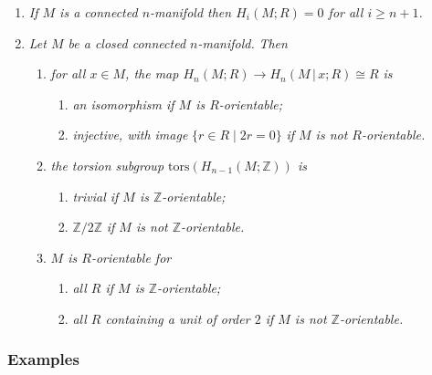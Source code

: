 \documentclass[10pt]{article}
\newcommand{\zz}{\mathbb{Z}}
\newcommand{\vbar}{\,|\,}
\begin{document}
            \begin{enumerate}
                \item \emph{If $M$ is a connected $n$-manifold then $H_i(M;R)=0$ for all $i\geqslant n+1$.}
                \item \emph{Let $M$ be a \emph{closed} connected $n$-manifold.}
                    \emph{Then}
                    \begin{enumerate}
                        \item \emph{for all $x\in M$, the map $H_n(M;R)\to H_n(M\vbar x;R)\cong R$ is}
                            \begin{enumerate}[label=(\roman*)]
                                \item \emph{an isomorphism if $M$ is $R$-orientable;}
                                \item \emph{injective, with image} $\{r\in R\mid 2r=0\}$ \emph{if $M$ is \emph{not} $R$-orientable.}
                            \end{enumerate}
                        \item \emph{the torsion subgroup $\mathrm{tors}(H_{n-1}(M;\zz))$ is}
                            \begin{enumerate}[label=(\roman*)]
                                \item \emph{trivial if $M$ is $\zz$-orientable;}
                                \item $\zz/2\zz$ \emph{if $M$ is \emph{not} $\zz$-orientable.}
                            \end{enumerate}
                        \item \emph{$M$ is $R$-orientable for}
                            \begin{enumerate}[label=(\roman*)]
                                \item \emph{all $R$ if $M$ is $\zz$-orientable;}
                                \item \emph{all $R$ containing a unit of order $2$ if $M$ is \emph{not} $\zz$-orientable.}
                            \end{enumerate}
                    \end{enumerate}
            \end{enumerate}

            \subsubsection{Examples}
\end{document}
